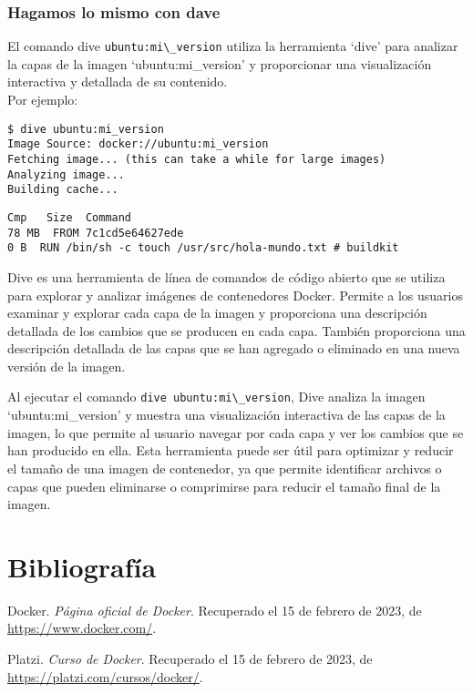 \documentclass{article}
\begin{document}
\subsubsection{Hagamos lo mismo con dave}
El comando dive \lstinline{ubuntu:mi\_version} utiliza la herramienta \enquote*{dive} para analizar la capas de la imagen \enquote*{ubuntu:mi\_version} y proporcionar una visualización interactiva y detallada de su contenido.\\
Por ejemplo:
\begin{lstlisting}[numbers=none]
$ dive ubuntu:mi_version
Image Source: docker://ubuntu:mi_version
Fetching image... (this can take a while for large images)
Analyzing image...
Building cache...      \end{lstlisting}

\begin{lstlisting}[numbers=none]
Cmp   Size  Command                                                          
78 MB  FROM 7c1cd5e64627ede    
0 B  RUN /bin/sh -c touch /usr/src/hola-mundo.txt # buildkit  
\end{lstlisting}
Dive es una herramienta de línea de comandos de código abierto que se utiliza para explorar y analizar imágenes de contenedores Docker. Permite a los usuarios examinar y explorar cada capa de la imagen y proporciona una descripción detallada de los cambios que se producen en cada capa. También proporciona una descripción detallada de las capas que se han agregado o eliminado en una nueva versión de la imagen.

Al ejecutar el comando \lstinline{dive ubuntu:mi\_version}, Dive analiza la imagen \enquote*{ubuntu:mi\_version} y muestra una visualización interactiva de las capas de la imagen, lo que permite al usuario navegar por cada capa y ver los cambios que se han producido en ella. Esta herramienta puede ser útil para optimizar y reducir el tamaño de una imagen de contenedor, ya que permite identificar archivos o capas que pueden eliminarse o comprimirse para reducir el tamaño final de la imagen.


\newpage
\section{Bibliografía}
\begin{thebibliography}{9}

      Docker. \textit{Página oficial de Docker}. Recuperado el 15 de febrero de 2023, de \url{https://www.docker.com/}.
      
      Platzi. \textit{Curso de Docker}. Recuperado el 15 de febrero de 2023, de \url{https://platzi.com/cursos/docker/}.
      
      \end{thebibliography}
\end{document}
